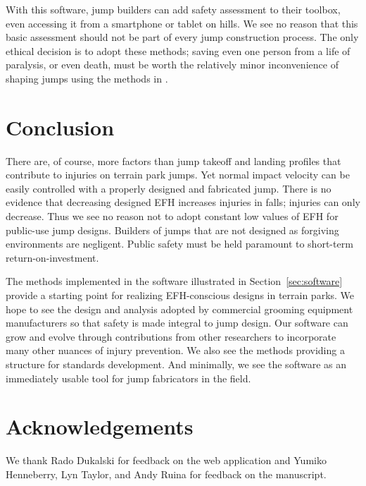 \documentclass[fleqn,10pt,lineno]{wlpeerj}
\begin{document}
With this software, jump builders can add safety assessment to their toolbox,
even accessing it from a smartphone or tablet on hills.  We see no reason that
this basic assessment should not be part of every jump construction process.
The only ethical decision is to adopt these methods; saving even one person
from a life of paralysis, or even death, must be worth the relatively minor
inconvenience of shaping jumps using the methods in \cite{Levy2015}.

\section*{Conclusion}
\label{sec:conc}
%
There are, of course, more factors than jump takeoff and landing profiles that
contribute to injuries on terrain park jumps. Yet normal impact velocity can be
easily controlled with a properly designed and fabricated jump. There is no
evidence that decreasing designed EFH increases injuries in falls; injuries can
only decrease. Thus we see no reason not to adopt constant low values of EFH
for public-use jump designs. Builders of jumps that are not designed as
forgiving environments are negligent. Public safety must be held paramount to
short-term return-on-investment.

The methods implemented in the software illustrated in
Section~\ref{sec:software} provide a starting point for realizing EFH-conscious
designs in terrain parks. We hope to see the design and analysis adopted by
commercial grooming equipment manufacturers so that safety is made integral to
jump design. Our software can grow and evolve through contributions from other
researchers to incorporate many other nuances of injury prevention. We also see
the methods providing a structure for standards development. And minimally, we
see the software as an immediately usable tool for jump fabricators in the
field.

\section*{Acknowledgements}
We thank Rado Dukalski for feedback on the web application and Yumiko
Henneberry, Lyn Taylor, and Andy Ruina for feedback on the manuscript.
\end{document}
